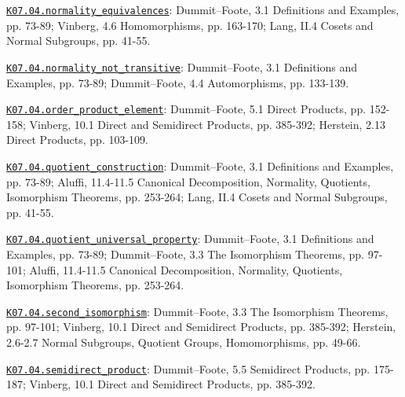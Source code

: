 \par\smallskip\noindent\hypertarget{src:K07.04.normality_equivalences}{}\label{src:K07.04.normality_equivalences}\hyperref[K07.04.normality_equivalences]{\texttt{K07.04.normality\_equivalences}}: Dummit--Foote, 3.1 Definitions and Examples, pp. 73-89; Vinberg, 4.6 Homomorphisms, pp. 163-170; Lang, II.4 Cosets and Normal Subgroups, pp. 41-55.
\par\smallskip\noindent\hypertarget{src:K07.04.normality_not_transitive}{}\label{src:K07.04.normality_not_transitive}\hyperref[K07.04.normality_not_transitive]{\texttt{K07.04.normality\_not\_transitive}}: Dummit--Foote, 3.1 Definitions and Examples, pp. 73-89; Dummit--Foote, 4.4 Automorphisms, pp. 133-139.
\par\smallskip\noindent\hypertarget{src:K07.04.order_product_element}{}\label{src:K07.04.order_product_element}\hyperref[K07.04.order_product_element]{\texttt{K07.04.order\_product\_element}}: Dummit--Foote, 5.1 Direct Products, pp. 152-158; Vinberg, 10.1 Direct and Semidirect Products, pp. 385-392; Herstein, 2.13 Direct Products, pp. 103-109.
\par\smallskip\noindent\hypertarget{src:K07.04.quotient_construction}{}\label{src:K07.04.quotient_construction}\hyperref[K07.04.quotient_construction]{\texttt{K07.04.quotient\_construction}}: Dummit--Foote, 3.1 Definitions and Examples, pp. 73-89; Aluffi, 11.4-11.5 Canonical Decomposition, Normality, Quotients, Isomorphism Theorems, pp. 253-264; Lang, II.4 Cosets and Normal Subgroups, pp. 41-55.
\par\smallskip\noindent\hypertarget{src:K07.04.quotient_universal_property}{}\label{src:K07.04.quotient_universal_property}\hyperref[K07.04.quotient_universal_property]{\texttt{K07.04.quotient\_universal\_property}}: Dummit--Foote, 3.1 Definitions and Examples, pp. 73-89; Dummit--Foote, 3.3 The Isomorphism Theorems, pp. 97-101; Aluffi, 11.4-11.5 Canonical Decomposition, Normality, Quotients, Isomorphism Theorems, pp. 253-264.
\par\smallskip\noindent\hypertarget{src:K07.04.second_isomorphism}{}\label{src:K07.04.second_isomorphism}\hyperref[K07.04.second_isomorphism]{\texttt{K07.04.second\_isomorphism}}: Dummit--Foote, 3.3 The Isomorphism Theorems, pp. 97-101; Vinberg, 10.1 Direct and Semidirect Products, pp. 385-392; Herstein, 2.6-2.7 Normal Subgroups, Quotient Groups, Homomorphisms, pp. 49-66.
\par\smallskip\noindent\hypertarget{src:K07.04.semidirect_product}{}\label{src:K07.04.semidirect_product}\hyperref[K07.04.semidirect_product]{\texttt{K07.04.semidirect\_product}}: Dummit--Foote, 5.5 Semidirect Products, pp. 175-187; Vinberg, 10.1 Direct and Semidirect Products, pp. 385-392.
